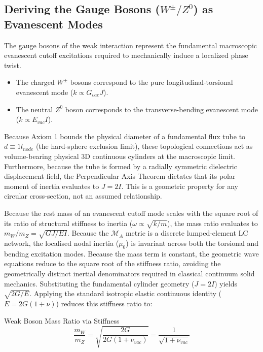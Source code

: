 \subsection{Deriving the Gauge Bosons (\texorpdfstring{$W^{\pm}/Z^{0}$}{W/Z}) as Evanescent Modes}

The gauge bosons of the weak interaction represent the fundamental macroscopic evanescent cutoff excitations required to mechanically induce a localized phase twist.

\begin{itemize}
\item The charged $W^{\pm}$ bosons correspond to the pure longitudinal-torsional evanescent mode ($k\propto G_{vac}J$).
\item The neutral $Z^{0}$ boson corresponds to the transverse-bending evanescent mode ($k\propto E_{vac}I$).
\end{itemize}

Because Axiom 1 bounds the physical diameter of a fundamental flux tube to $d \equiv 1 l_{node}$ (the hard-sphere exclusion limit), these topological connections act as volume-bearing physical 3D continuous cylinders at the macroscopic limit. Furthermore, because the tube is formed by a radially symmetric dielectric displacement field, the Perpendicular Axis Theorem dictates that its polar moment of inertia evaluates to $J=2I$. This is a geometric property for any circular cross-section, not an assumed relationship.

Because the rest mass of an evanescent cutoff mode scales with the square root of its ratio of structural stiffness to inertia ($\omega \propto \sqrt{k/m}$), the mass ratio evaluates to $m_W/m_Z = \sqrt{GJ / EI}$. Because the $\mathcal{M}_A$ metric is a discrete lumped-element LC network, the localised nodal inertia ($\mu_0$) is invariant across both the torsional and bending excitation modes. Because the mass term is constant, the geometric wave equations reduce to the square root of the stiffness ratio, avoiding the geometrically distinct inertial denominators required in classical continuum solid mechanics. Substituting the fundamental cylinder geometry ($J=2I$) yields $\sqrt{2G/E}$. Applying the standard isotropic elastic continuous identity ($E = 2G(1+\nu)$) reduces this stiffness ratio to:

\begin{resultbox}{Weak Boson Mass Ratio via Stiffness}
\begin{equation}
\frac{m_W}{m_Z} = \sqrt{\frac{2G}{2G(1+\nu_{vac})}} = \frac{1}{\sqrt{1+\nu_{vac}}}
\end{equation}
\end{resultbox}

